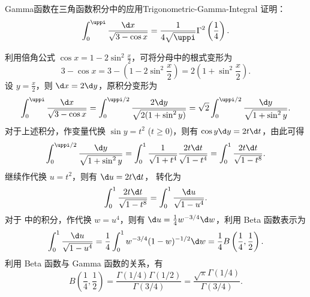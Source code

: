 \begin{problem}{Gamma函数在三角函数积分中的应用}{Trigonometric-Gamma-Integral}
    证明：
    \begin{equation}\label{eq:q13-target}
        \int_0^{\uppi} \frac{\d x}{\sqrt{3 - \cos x}} = \frac{1}{4\sqrt{\uppi}} \Gamma^2\left(\frac{1}{4}\right).
    \end{equation}
\end{problem}

\begin{myproof}
    利用倍角公式 $\cos x = 1 - 2\sin^2\frac{x}{2}$，可将分母中的根式变形为
    \begin{equation}\label{eq:q13-trig-reform}
        3 - \cos x = 3 - \left( 1 - 2\sin^2\frac{x}{2} \right) = 2 \left( 1 + \sin^2\frac{x}{2} \right).
    \end{equation}
    设 $y = \frac{x}{2}$，则 $\d x = 2\d y$，原积分变形为
    \begin{equation}\label{eq:q13-sub-y}
        \int_0^{\uppi} \frac{\d x}{\sqrt{3 - \cos x}} = \int_0^{\uppi/2} \frac{2\d y}{\sqrt{2(1 + \sin^2 y)}} = \sqrt{2} \int_0^{\uppi/2} \frac{\d y}{\sqrt{1 + \sin^2 y}}.
    \end{equation}
    对于上述积分，作变量代换 $\sin y = t^2$ ($t \geqslant 0$)，则有 $\cos y \d y = 2t\d t$，由此可得
    \begin{equation}\label{eq:q13-sub-t}
        \int_0^{\uppi/2} \frac{\d y}{\sqrt{1 + \sin^2 y}} = \int_0^1 \frac{1}{\sqrt{1 + t^4}} \frac{2t\d t}{\sqrt{1 - t^4}} = \int_0^1 \frac{2t\d t}{\sqrt{1 - t^8}}.
    \end{equation}
    继续作代换 $u = t^2$，则有 $\d u = 2t\d t$， 转化为
    \begin{equation}\label{eq:q13-sub-u}
        \int_0^1 \frac{2t\d t}{\sqrt{1 - t^8}} = \int_0^1 \frac{\d u}{\sqrt{1 - u^4}}.
    \end{equation}
    对于  中的积分，作代换 $w = u^4$，则有 $\d u = \frac{1}{4} w^{-3/4} \d w$，利用 Beta 函数表示为
    \begin{equation}\label{eq:q13-beta-eval}
        \int_0^1 \frac{\d u}{\sqrt{1 - u^4}} = \frac{1}{4} \int_0^1 w^{-3/4} (1-w)^{-1/2} \d w = \frac{1}{4} B\left(\frac{1}{4}, \frac{1}{2}\right).
    \end{equation}
    利用 Beta 函数与 Gamma 函数的关系，有
    \begin{equation}\label{eq:q13-gamma-eval}
        B\left(\frac{1}{4}, \frac{1}{2}\right) = \frac{\Gamma(1/4)\Gamma(1/2)}{\Gamma(3/4)} = \frac{\sqrt{\uppi}\Gamma(1/4)}{\Gamma(3/4)}.

\end{equation}
\end{myproof}

